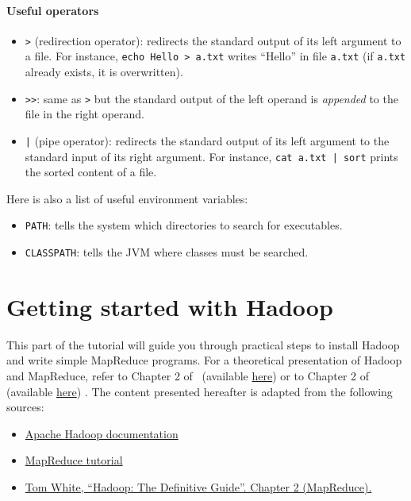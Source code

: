 \documentclass[11pt]{article}
\begin{document}
\subsection{Useful operators}
\begin{itemize}
  \item \texttt{>} (redirection operator): redirects the standard
    output of its left argument to a file. For instance, \texttt{echo
      Hello > a.txt} writes ``Hello'' in file \texttt{a.txt} (if
    \texttt{a.txt} already exists, it is overwritten).
    \item \texttt{>>}: same as \texttt{>} but the standard output of
      the left operand is \emph{appended} to the file in the right operand.
  \item \texttt{|} (pipe operator): redirects the standard output of
    its left argument to the standard input of its right argument. For
    instance, \texttt{cat a.txt | sort} prints the sorted content of a
    file.
\end{itemize}
Here is also a list of useful environment variables:
\begin{itemize}
  \item \texttt{PATH}: tells the system which directories to search for executables.
  \item \texttt{CLASSPATH}: tells the JVM where classes must be searched.
\end{itemize}

\newpage

\part{Getting started with Hadoop}

This part of the tutorial will guide you through practical steps to
install Hadoop and write simple MapReduce programs. For a theoretical
presentation of Hadoop and MapReduce, refer to Chapter 2
of~\cite{mmds} (available
\href{http://infolab.stanford.edu/~ullman/mmds/ch2.pdf}{here}) or to
Chapter 2 of~\cite{lin} (available
\href{http://lintool.github.io/MapReduceAlgorithms/ed1n/MapReduce-algorithms.pdf}{here})
.  The content presented hereafter is adapted from the following
sources:
\begin{itemize}
\item \href{http://hadoop.apache.org/docs/r2.7.3/index.html}{Apache Hadoop documentation}
\item \href{http://hadoop.apache.org/docs/r2.7.3/hadoop-mapreduce-client/hadoop-mapreduce-client-core/MapReduceTutorial.html}{MapReduce tutorial}
\item \href{http://hadoopbook.com}{Tom White, ``Hadoop: The Definitive Guide''. Chapter 2 (MapReduce).}
\end{itemize}
\end{document}
